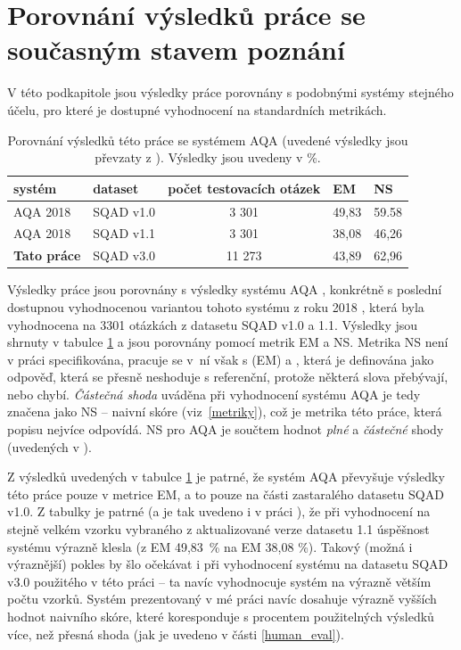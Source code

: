 \section*{Porovnání výsledků práce se současným stavem poznání}
V této podkapitole jsou výsledky práce porovnány s podobnými systémy stejného účelu, pro které je dostupné vyhodnocení na standardních metrikách.\par
\begin{table}[H]
\centering
\begin{tabular}{|l|l|c||l|l|}
\hline
systém     & dataset   & počet testovacích otázek & \textbf{EM} & \textbf{NS} \\ \hline \hline
AQA 2018   & SQAD v1.0 & 3 301                    & 49,83       & 59.58       \\ \hline
AQA 2018   & SQAD v1.1 & 3 301                    & 38,08       & 46,26       \\ \hline
\textbf{Tato práce} & SQAD v3.0 & 11 273                   & 43,89       & 62,96       \\ \hline
\end{tabular}
\caption{Porovnání výsledků této práce se systémem AQA \cite{aqa} (uvedené výsledky jsou převzaty z \cite{aqa2018}). Výsledky jsou uvedeny v \%.}
\label{tab:aqa_compare}
\end{table}
Výsledky práce jsou porovnány s výsledky systému AQA \cite{aqa}, konkrétně s poslední dostupnou vyhodnocenou variantou tohoto systému z roku 2018 \cite{aqa2018}, která byla vyhodnocena na 3301 otázkách z datasetu SQAD v1.0 a 1.1. Výsledky jsou shrnuty v tabulce \ref{tab:aqa_compare} a jsou porovnány pomocí metrik EM a NS. Metrika NS není v práci specifikována, pracuje se v~ní však s  (EM) a , která je definována jako odpověď, která se přesně neshoduje s referenční, protože některá slova přebývají, nebo chybí. \emph{Částečná shoda} uváděna při vyhodnocení systému AQA je tedy značena jako NS -- naivní skóre (viz~\ref{metriky}), což je metrika této práce, která popisu nejvíce odpovídá. NS pro AQA je součtem hodnot \emph{plné} a \emph{částečné} shody (uvedených v \cite{aqa2018}).\par
Z výsledků uvedených v tabulce \ref{tab:aqa_compare} je patrné, že systém AQA převyšuje výsledky této práce pouze v metrice EM, a to pouze na části zastaralého datasetu SQAD v1.0. Z tabulky je patrné (a je tak uvedeno i v práci \cite{aqa2018}), že při vyhodnocení na stejně velkém vzorku vybraného z aktualizované verze datasetu 1.1 úspěšnost systému výrazně klesla (z EM 49,83~\% na EM 38,08 \%). Takový (možná i výraznější) pokles by šlo očekávat i při vyhodnocení systému na datasetu SQAD v3.0 použitého v této práci -- ta navíc vyhodnocuje systém na výrazně větším počtu vzorků. Systém prezentovaný v mé práci navíc dosahuje výrazně vyšších hodnot naivního skóre, které koresponduje s procentem použitelných výsledků více, než přesná shoda (jak je uvedeno v části \ref{human_eval}).\par
